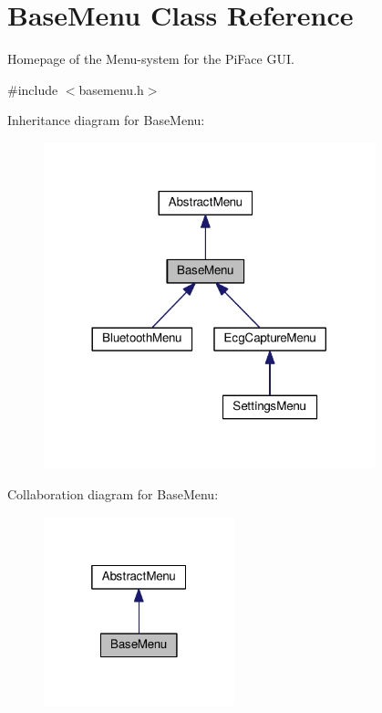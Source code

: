 \hypertarget{classBaseMenu}{}\section{Base\+Menu Class Reference}
\label{classBaseMenu}


Homepage of the Menu-\/system for the Pi\+Face G\+UI.  




{\ttfamily \#include $<$basemenu.\+h$>$}



Inheritance diagram for Base\+Menu\+:\nopagebreak
\begin{figure}[H]
\begin{center}
\leavevmode
\includegraphics[width=272pt]{classBaseMenu__inherit__graph}
\end{center}
\end{figure}


Collaboration diagram for Base\+Menu\+:\nopagebreak
\begin{figure}[H]
\begin{center}
\leavevmode
\includegraphics[width=157pt]{classBaseMenu__coll__graph}
\end{center}
\end{figure}

